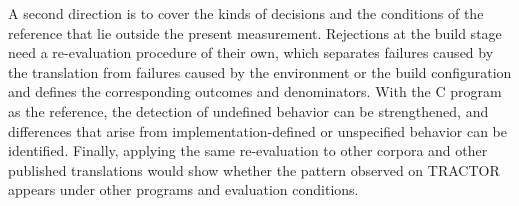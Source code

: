 A second direction is to cover the kinds of decisions and the conditions of the reference that lie outside the present measurement. Rejections at the build stage need a re-evaluation procedure of their own, which separates failures caused by the translation from failures caused by the environment or the build configuration and defines the corresponding outcomes and denominators. With the C program as the reference, the detection of undefined behavior can be strengthened, and differences that arise from implementation-defined or unspecified behavior can be identified. Finally, applying the same re-evaluation to other corpora and other published translations would show whether the pattern observed on TRACTOR appears under other programs and evaluation conditions.
